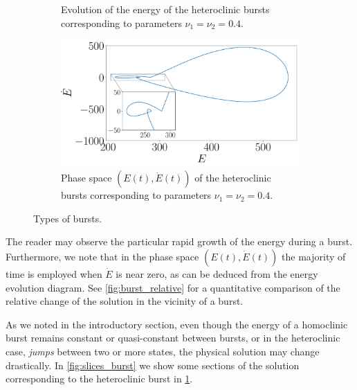\documentclass[twoside]{article}
\begin{document}
\begin{figure}[ht]
\begin{subfigure}[ht]{0.4\textwidth}
    \caption{Evolution of the energy of the heteroclinic bursts corresponding to parameters $\nu_1=\nu_2=0.4$.}
    \label{fig:he_c}
  \end{subfigure}\hspace{0.06666\textwidth}
  \begin{subfigure}[ht]{0.4\textwidth}
    \includegraphics[width=\textwidth]{images/hetero_burst_phase.pdf}
    \caption{Phase space $(E(t), \dot{E}(t))$ of the heteroclinic bursts corresponding to parameters $\nu_1=\nu_2=0.4$.}
  \end{subfigure}
  \caption{Types of bursts.}
  \label{fig:burst}
\end{figure}

The reader may observe the particular rapid growth of the energy during a burst. Furthermore, we note that in the phase space $(E(t), \dot{E}(t))$ the majority of time is employed when $\dot{E}$ is near zero, as can be deduced from the energy evolution diagram. See \cref{fig:burst_relative} for a quantitative comparison of the relative change of the solution in the vicinity of a burst.

As we noted in the introductory section, even though the energy of a homoclinic burst remains constant or quasi-constant between bursts, or in the heteroclinic case, \emph{jumps} between two or more states, the physical solution may change drastically. In \cref{fig:slices_burst} we show some sections of the solution corresponding to the heteroclinic burst in \cref{fig:he_c}.
\end{document}
